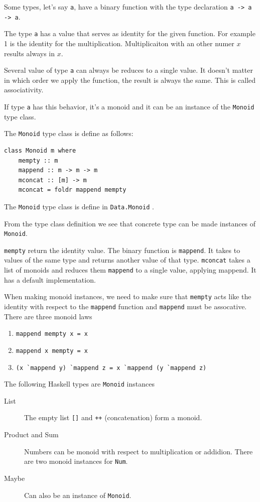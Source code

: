 \documentclass[twoside, a4paper, 12pt]{article}
\begin{document}
Some types, let's say \verb|a|, have a binary function with the type declaration \verb|a -> a -> a|. 

The type \verb|a| has a value that serves as identity for the given function. For example 1 is the identity for the multiplication. Multiplicaiton with an other numer $x$ results always in $x$.

Several value of type \verb|a| can always be reduces to a single value. It doesn't matter in which order we apply the function, the result is always the same. This is called associativity.

If type \verb|a| has this behavior, it's a monoid and it can be an instance of the \verb|Monoid| type class.

The \verb|Monoid| type class is define as follows:
\begin{verbatim}
class Monoid m where
    mempty :: m
    mappend :: m -> m -> m
    mconcat :: [m] -> m
    mconcat = foldr mappend mempty
\end{verbatim}

The \verb|Monoid| type class is define in \verb|Data.Monoid| \cite{monoid}. 

From the type class definition we see that concrete type can be made instances of \verb|Monoid|. 

\verb|mempty| return the identity value. The binary function is \verb|mappend|. It takes to values of the same type and returns another value of that type. \verb|mconcat| takes a list of monoids and reduces them \verb|mappend| to a single value, applying mappend. It has a default implementation.

When making monoid instances, we need to make sure that \verb|mempty| acts like the identity with respect to the \verb|mappend| function and \verb|mappend| must be assocative. There are three monoid laws

\begin{enumerate}
\item \verb|mappend mempty x = x|
\item \verb|mappend x mempty = x|
\item \verb|(x `mappend y) `mappend z = x `mappend (y `mappend z)|
\end{enumerate}

The following Haskell types are \verb|Monoid| instances
\begin{description}
\item[List] The empty list \verb|[]| and \verb|++| (concatenation) form a monoid.
\item[Product and Sum] Numbers can be monoid with respect to multiplication or addidion. There are two monoid instances for \verb|Num|.
\item[Maybe] Can also be an instance of \verb|Monoid|.
\end{description}
\end{document}
